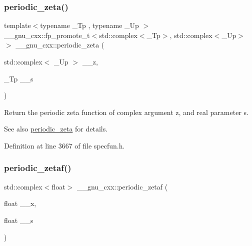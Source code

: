 \subsubsection{\texorpdfstring{periodic\+\_\+zeta()}{periodic\_zeta()}\hspace{0.1cm}{\footnotesize\ttfamily [2/2]}}
{\footnotesize\ttfamily template$<$typename \+\_\+\+Tp , typename \+\_\+\+Up $>$ \\
\+\_\+\+\_\+gnu\+\_\+cxx\+::fp\+\_\+promote\+\_\+t$<$std\+::complex$<$\+\_\+\+Tp$>$, std\+::complex$<$\+\_\+\+Up$>$ $>$ \+\_\+\+\_\+gnu\+\_\+cxx\+::periodic\+\_\+zeta (\begin{DoxyParamCaption}\item[{std\+::complex$<$ \+\_\+\+Up $>$}]{\+\_\+\+\_\+z,  }\item[{\+\_\+\+Tp}]{\+\_\+\+\_\+s }\end{DoxyParamCaption})\hspace{0.3cm}{\ttfamily [inline]}}

Return the periodic zeta function of complex argument {\ttfamily z}, and real parameter {\ttfamily s}.

\begin{DoxySeeAlso}{See also}
\hyperlink{group__mathsf__gnu_ga06b06216e87b868cb21c76d33ac560c8}{periodic\+\_\+zeta} for details. 
\end{DoxySeeAlso}


Definition at line 3667 of file specfun.\+h.

\mbox{\label{group__mathsf__gnu_ga1308c2a5d1b263757485cb48eb2c19ff}} 
\subsubsection{\texorpdfstring{periodic\+\_\+zetaf()}{periodic\_zetaf()}}
{\footnotesize\ttfamily std\+::complex$<$float$>$ \+\_\+\+\_\+gnu\+\_\+cxx\+::periodic\+\_\+zetaf (\begin{DoxyParamCaption}\item[{float}]{\+\_\+\+\_\+x,  }\item[{float}]{\+\_\+\+\_\+s }\end{DoxyParamCaption})\hspace{0.3cm}{\ttfamily [inline]}}

